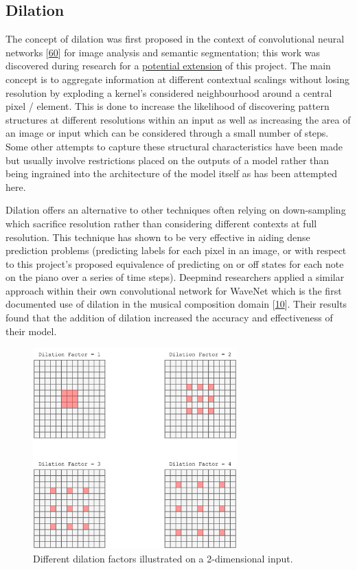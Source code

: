\documentclass[12pt,]{article}
\begin{document}
\hypertarget{dilation}{%
\subsection{Dilation}\label{dilation}}

The concept of dilation was first proposed in the context of
convolutional neural networks
{[}\protect\hyperlink{ref-yu2015multi}{60}{]} for image analysis and
semantic segmentation; this work was discovered during research for a
\protect\hyperlink{sentimentalinputfromimages}{potential extension} of
this project. The main concept is to aggregate information at different
contextual scalings without losing resolution by exploding a kernel's
considered neighbourhood around a central pixel / element. This is done
to increase the likelihood of discovering pattern structures at
different resolutions within an input as well as increasing the area of
an image or input which can be considered through a small number of
steps. Some other attempts to capture these structural characteristics
have been made but usually involve restrictions placed on the outputs of
a model rather than being ingrained into the architecture of the model
itself as has been attempted here.

Dilation offers an alternative to other techniques often relying on
down-sampling which sacrifice resolution rather than considering
different contexts at full resolution. This technique has shown to be
very effective in aiding dense prediction problems (predicting labels
for each pixel in an image, or with respect to this project's proposed
equivalence of predicting on or off states for each note on the piano
over a series of time steps). Deepmind researchers applied a similar
approach within their own convolutional network for WaveNet which is the
first documented use of dilation in the musical composition domain
{[}\protect\hyperlink{ref-oord2016wavenet}{10}{]}. Their results found
that the addition of dilation increased the accuracy and effectiveness
of their model.

\begin{figure}
\centering
\includegraphics[width=0.7\textwidth,height=\textheight]{Images/dilation2d.png}
\caption{Different dilation factors illustrated on a 2-dimensional
input.}
\end{figure}
\end{document}
